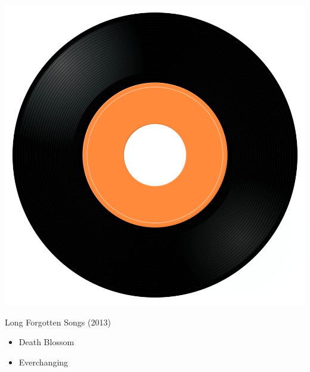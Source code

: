 \begin{minipage}[t]{0.25\textwidth}
\captionsetup{type=figure}
\includegraphics[width=\textwidth]{Images/cover.png}
\caption*{Long Forgotten Songs (2013)}
\end{minipage}
\begin{minipage}[t]{0.25\textwidth}\vspace{0pt}
\begin{itemize}[nosep,leftmargin=1em,labelwidth=*,align=left]
	\setlength{\itemsep}{0pt}
	\item Death Blossom
	\item Everchanging
\end{itemize}
\end{minipage}
